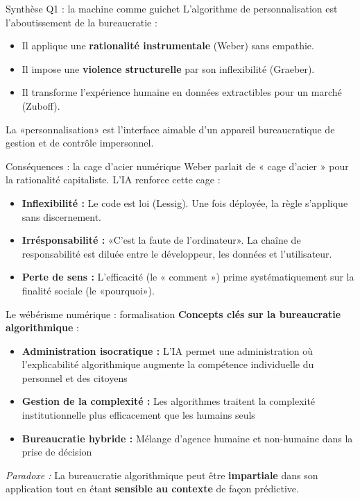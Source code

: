 \documentclass[9pt, aspectratio=169]{beamer}
\begin{document}
\begin{frame}{Synthèse Q1 : la machine comme guichet}
    L'algorithme de personnalisation est l'aboutissement de la bureaucratie :
    \begin{itemize}
        \item Il applique une \textbf{rationalité instrumentale} (Weber) sans empathie.
        \item Il impose une \textbf{violence structurelle} par son inflexibilité (Graeber).
        \item Il transforme l'expérience humaine en données extractibles pour un marché (Zuboff).
    \end{itemize}
    \vspace{0.3cm}
    La «personnalisation» est l'interface aimable d'un appareil bureaucratique de gestion et de contrôle impersonnel.
\end{frame}

\begin{frame}{Conséquences : la cage d'acier numérique}
    Weber parlait de « cage d'acier » pour la rationalité capitaliste. L'IA renforce cette cage :
    \begin{itemize}
        \item \textbf{Inflexibilité :} Le code est loi (Lessig). Une fois déployée, la règle s'applique sans discernement.
        \item \textbf{Irrésponsabilité :} «C'est la faute de l'ordinateur». La chaîne de responsabilité est diluée entre le développeur, les données et l'utilisateur.
        \item \textbf{Perte de sens :} L'efficacité (le « comment ») prime systématiquement sur la finalité sociale (le «pourquoi»).
    \end{itemize}
\end{frame}

\begin{frame}{Le wébérisme numérique : formalisation}
    \textbf{Concepts clés sur la bureaucratie algorithmique} :
    
    \vspace{0.3cm}
    \begin{itemize}
        \item \textbf{Administration isocratique :} L'IA permet une administration où l'explicabilité algorithmique augmente la compétence individuelle du personnel et des citoyens
        \item \textbf{Gestion de la complexité :} Les algorithmes traitent la complexité institutionnelle plus efficacement que les humains seuls
        \item \textbf{Bureaucratie hybride :} Mélange d'agence humaine et non-humaine dans la prise de décision
    \end{itemize}
    
    \vspace{0.3cm}
    \textit{Paradoxe :} La bureaucratie algorithmique peut être \textbf{impartiale} dans son application tout en étant \textbf{sensible au contexte} de façon prédictive.
\end{frame}
\end{document}
